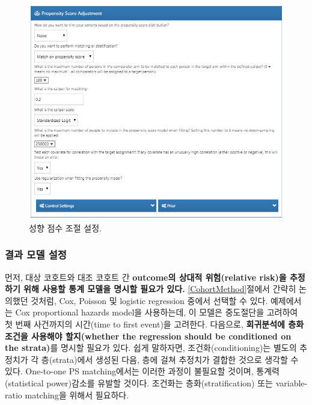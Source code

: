 \documentclass[11pt]{book}
\theoremstyle{definition}
\theoremstyle{definition}
\theoremstyle{definition}
\theoremstyle{remark}
\begin{document}
\begin{figure}

{\centering \includegraphics[width=1\linewidth]{images/PopulationLevelEstimation/psSettings} 

}

\caption{성향 점수 조절 설정.}\label{fig:psSettings}
\end{figure}

\subsubsection*{결과 모델 설정}\label{--}

먼저, 대상 코호트와 대조 코호트 간 \textbf{outcome의 상대적
위험(relative risk)을 추정하기 위해 사용할 통계 모델을 명시할 필요가
있다.} \ref{CohortMethod}절에서 간략히 논의했던 것처럼, Cox, Poisson 및
logistic regression 중에서 선택할 수 있다. 예제에서는 Cox proportional
hazards model을 사용하는데, 이 모델은 중도절단을 고려하여 첫 번째
사건까지의 시간(time to first event)을 고려한다. 다음으로,
\textbf{회귀분석에 층화 조건을 사용해야 할지(whether the regression
should be conditioned on the strata)}를 명시할 필요가 있다. 쉽게
말하자면, 조건화(conditioning)는 별도의 추정치가 각 층(strata)에서
생성된 다음, 층에 걸쳐 추정치가 결합한 것으로 생각할 수 있다. One-to-one
PS matching에서는 이러한 과정이 불필요할 것이며, 통계력(statistical
power)감소를 유발할 것이다. 조건화는 층화(stratification) 또는
variable-ratio matching을 위해서 필요하다. 
\end{document}

